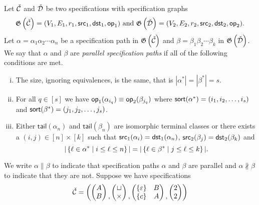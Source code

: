 \begin{definition}
Let $\check{\mathcal{C}}$ and $\check{\mathcal{D}}$ be two specifications with specification graphs 
\[
\mathfrak{G}\left(\check{\mathcal{C}}\right)=(V_1,E_1,r_1,\textsf{src}_1,\textsf{dst}_1,\textsf{op}_1) \text{ and } \mathfrak{G}\left(\check{\mathcal{D}}\right) = (V_2,E_2,r_2,\textsf{src}_2,\textsf{dst}_2,\textsf{op}_2).
\]
Let $\alpha=\alpha_1\alpha_2 \dotsm \alpha_n$ be a specification path in $\mathfrak{G}\left(\check{\mathcal{C}}\right)$ and $\beta=\beta_1\beta_2 \dotsm \beta_k$ in $\mathfrak{G}\left(\check{\mathcal{D}}\right)$. We say that $\alpha$ and $\beta$ are \emph{parallel specification paths} if all of the following conditions are met.
\begin{enumerate}[i.]
    \item The size, ignoring equivalences, is the same, that is $|\alpha^\ast| = |\beta^\ast| = s$.
    \item For all $q\in[s]$ we have $\textsf{op}_1(\alpha_{i_q}) \equiv \textsf{op}_2(\beta_{j_q})$ where $\textsf{sort}(\alpha^\ast) = (i_1,i_2,\dotsc,i_s)$ and $\textsf{sort}(\beta^\ast) = (j_1,j_2,\dotsc,j_s)$.
    \item Either $\textsf{tail}(\alpha_n)$ and $\textsf{tail}(\beta_n)$ are isomorphic terminal classes or there exists a $(i,j) \in [n] \times [k]$ such that $\textsf{src}_1(\alpha_i) = \textsf{dst}_1(\alpha_n)$, $\textsf{src}_2(\beta_j) = \textsf{dst}_2(\beta_k)$ and
    \[
        |\left\{\ell \in \alpha^\ast \mid i \leq \ell \leq n\right\}| = |\left\{\ell \in \beta^\ast \mid j \leq \ell \leq k\right\}|.
    \]
\end{enumerate}
\end{definition}
We write $\alpha \parallel \beta$ to indicate that specification paths $\alpha$ and $\beta$ are parallel and $\alpha \nparallel \beta$ to indicate that they are not. Suppose we have specifications
\[
    \check{\mathcal{C}} = \left(
        \begin{pmatrix}
            A\\
            B
        \end{pmatrix}
        \begin{matrix}\\,\end{matrix}
        \begin{pmatrix}
            \sqcup\\
            \times
        \end{pmatrix}
        \begin{matrix}\\,\end{matrix}
        \begin{pmatrix}
            \left\{\varepsilon\right\} & B\\
            \left\{c\right\} & A
        \end{pmatrix}
        \begin{matrix}\\,\end{matrix}
        \begin{pmatrix}
            2\\
            2
        \end{pmatrix}
    \right)
\]
